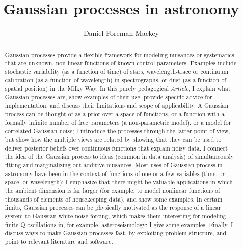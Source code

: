 \documentclass[modern, letterpaper]{aastex61}
\newcommand{\documentname}{\textsl{Article}}
\begin{document}
\sloppy\sloppypar\raggedbottom\frenchspacing

\title{Gaussian processes in astronomy}


\author[0000-0002-9328-5652]{Daniel Foreman-Mackey}

\begin{abstract}\noindent
Gaussian processes provide a flexible framework
for modeling nuisances or systematics that are unknown, non-linear functions of known
control parameters.
Examples include stochastic variability (as a function of time) of stars, wavelength-trace
or continuum calibration (as a function of wavelength) in spectrographs,
or dust (as a function of spatial position) in the Milky Way.
In this purely pedagogical \documentname, I explain what Gaussian processes are,
show examples of their use, provide specific advice for implementation, and discuss their
limitations and scope of applicability.
A Gaussian process can be thought of as a prior over a space of functions,
or a function with a formally infinite number of free parameters (a non-parametric model),
or a model for correlated Gaussian noise;
I introduce the processes through the latter point of view, but show how the multiple
views are related by showing that they can be used to deliver posterior beliefs
over continuous functions that explain noisy data.
I connect the idea of the Gaussian process to ideas (common in
data analysis) of simultaneously fitting and marginalizing out additive nuisances.
Most uses of Gaussian process in astronomy have been in the context of functions of one
or a few variables (time, or space, or wavelength); I emphasize that there might be
valuable applications in which the ambient dimension is far larger (for example, to model
nonlinear functions of thousands of elements of housekeeping data), and show some examples.
In certain limits, Gaussian processes can be physically motivated as the response
of a linear system to Gaussian white-noise forcing, which makes them interesting for
modeling finite-Q oscillations in, for example, asteroseismology; I give some examples.
Finally, I discuss ways to make Gaussian processes fast, by exploiting problem structure,
and point to relevant literature and software.
\end{abstract}
\end{document}

